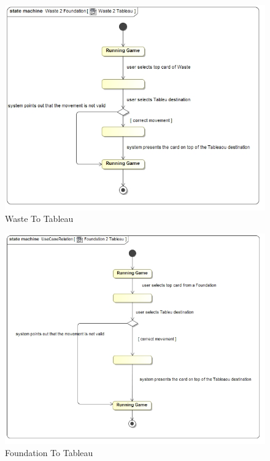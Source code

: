\documentclass[11pt]{article}
\begin{document}
\begin{center}
 \begin{figure}[H]
 \begin{center}
   \includegraphics[width=15cm]{DomainModel/Waste2Tableau.jpg}
   \caption{Waste To Tableau}
   \label{fig:waste2tableau}
 \end{center}
 \end{figure}
\end{center}

\begin{center}
 \begin{figure}[H]
 \begin{center}
   \includegraphics[width=15cm]{DomainModel/Foundation2Tableau.jpg}
   \caption{Foundation To Tableau}
   \label{fig:foundation2tableau}
 \end{center}
 \end{figure}
\end{center}
\end{document}
